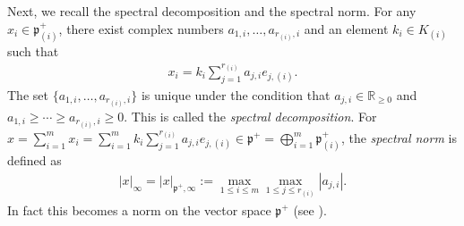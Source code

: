 \documentclass[pdftex]{sigma}
\numberwithin{equation}{section}
\newcommand{\BR}{\mathbb{R}}
\newcommand{\fp}{\mathfrak{p}}
\begin{document}
Next, we recall the spectral decomposition and the spectral norm. For any $x_i\in\fp^+_{(i)}$, there exist complex numbers
$a_{1,i},\ldots, a_{r_{(i)},i}$ and an element $k_i\in K_{(i)}$ such that
\begin{gather*} x_i=k_i\sum_{j=1}^{r_{(i)}} a_{j,i}e_{j,(i)}. \end{gather*}
The set $\{a_{1,i},\ldots,a_{r_{(i)},i}\}$ is unique under the condition that $a_{j,i}\in\BR_{\ge 0}$ and
$a_{1,i}\ge\cdots\ge a_{r_{(i)},i}\ge 0$. This is called the \textit{spectral decomposition}.
For $x=\sum\limits_{i=1}^m x_i=\sum\limits_{i=1}^m k_i\sum\limits_{j=1}^{r_{(i)}}a_{j,i}e_{j,(i)}\in\fp^+=\bigoplus\limits_{i=1}^m \fp^+_{(i)}$,
the \textit{spectral norm} is defined as
\begin{gather}\label{spectral_norm}
|x|_\infty=|x|_{\fp^+,\infty}:=\max_{1\le i\le m}\max_{1\le j\le r_{(i)}}|a_{j,i}|.
\end{gather}
In fact this becomes a norm on the vector space $\fp^+$ (see \cite[Part V, Proposition VI.4.1]{FKKLR}).
\end{document}
